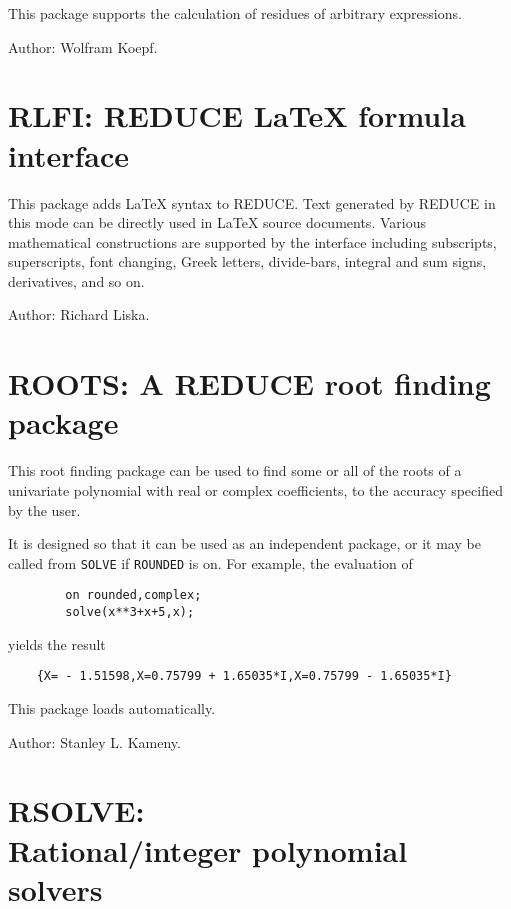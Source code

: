 This package supports the calculation of residues of arbitrary
expressions.

Author: Wolfram Koepf.




\newpage

\section{RLFI: REDUCE \LaTeX{} formula interface} 

This package adds \LaTeX{} syntax to REDUCE.  Text generated by REDUCE in
this mode can be directly used in \LaTeX{} source documents.  Various
mathematical constructions are supported by the interface including
subscripts, superscripts, font changing, Greek letters, divide-bars,
integral and sum signs, derivatives, and so on.

Author: Richard Liska.



\newpage

\section{ROOTS: A REDUCE root finding package} 

This root finding package can be used to find some or all of the roots of a
univariate polynomial with real or complex coefficients, to the accuracy
specified by the user.

It is designed so that it can be used as an independent package, or it may
be called from {\tt SOLVE} if {\tt ROUNDED} is on. For example,
the evaluation of
\begin{verbatim}
        on rounded,complex;
        solve(x**3+x+5,x);
\end{verbatim}
yields the result
\begin{verbatim}
    {X= - 1.51598,X=0.75799 + 1.65035*I,X=0.75799 - 1.65035*I}
\end{verbatim}

This package loads automatically.

Author: Stanley L. Kameny.



\newpage

\section[RSOLVE: Rational/integer polynomial solvers]%
        {RSOLVE: \protect\\ Rational/integer polynomial solvers}

